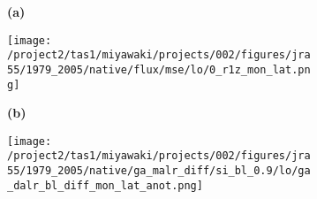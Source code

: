 \documentclass[preview]{standalone}
\begin{document}
\begin{figure}

  \begin{subfigure}[t]{0.05\textwidth}
    \textbf{\large{(a)}}
  \end{subfigure}
  \begin{subfigure}[t]{0.95\textwidth}
    \texttt{[image: /project2/tas1/miyawaki/projects/002/figures/jra55/1979\_2005/native/flux/mse/lo/0\_r1z\_mon\_lat.png]}
  \end{subfigure}
  
  \begin{subfigure}[t]{0.05\textwidth}
    \textbf{\large{(b)}}
  \end{subfigure}
  \begin{subfigure}[t]{0.95\textwidth}
    \texttt{[image: /project2/tas1/miyawaki/projects/002/figures/jra55/1979\_2005/native/ga\_malr\_diff/si\_bl\_0.9/lo/ga\_dalr\_bl\_diff\_mon\_lat\_anot.png]}
  \end{subfigure}
  
\end{figure}
  
\end{document}
